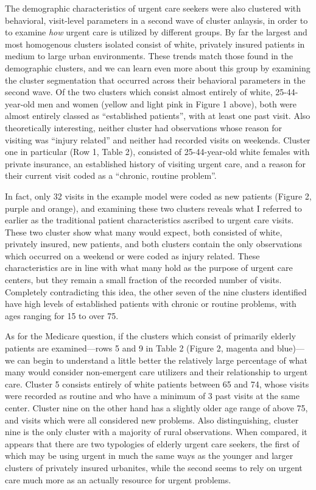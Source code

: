 \documentclass[12pt,twoside]{reedthesis}
\begin{document}
  The demographic characteristics of urgent care seekers were also
  clustered with behavioral, visit-level parameters in a second wave of
  cluster anlaysis, in order to to examine \emph{how} urgent care is
  utilized by different groups. By far the largest and most homogenous
  clusters isolated consist of white, privately insured patients in medium
  to large urban environments. These trends match those found in the
  demographic clusters, and we can learn even more about this group by
  examining the cluster segmentation that occurred across their behavioral
  parameters in the second wave. Of the two clusters which consist almost
  entirely of white, 25-44-year-old men and women (yellow and light pink
  in Figure 1 above), both were almost entirely classed as ``established
  patients'', with at least one past visit. Also theoretically
  interesting, neither cluster had observations whose reason for visiting
  was ``injury related'' and neither had recorded visits on weekends.
  Cluster one in particular (Row 1, Table 2), consisted of 25-44-year-old
  white females with private insurance, an established history of visiting
  urgent care, and a reason for their current visit coded as a ``chronic,
  routine problem''.
  
  In fact, only 32 visits in the example model were coded as new patients
  (Figure 2, purple and orange), and examining these two clusters reveals
  what I referred to earlier as the traditional patient characteristics
  ascribed to urgent care visits. These two cluster show what many would
  expect, both consisted of white, privately insured, new patients, and
  both clusters contain the only observations which occurred on a weekend
  or were coded as injury related. These characteristics are in line with
  what many hold as the purpose of urgent care centers, but they remain a
  small fraction of the recorded number of visits. Completely
  contradicting this idea, the other seven of the nine clusters identified
  have high levels of established patients with chronic or routine
  problems, with ages ranging for 15 to over 75.
  
  As for the Medicare question, if the clusters which consist of primarily
  elderly patients are examined---rows 5 and 9 in Table 2 (Figure 2,
  magenta and blue)---we can begin to understand a little better the
  relatively large percentage of what many would consider non-emergent
  care utilizers and their relationship to urgent care. Cluster 5 consists
  entirely of white patients between 65 and 74, whose visits were recorded
  as routine and who have a minimum of 3 past visits at the same center.
  Cluster nine on the other hand has a slightly older age range of above
  75, and visits which were all considered new problems. Also
  distinguishing, cluster nine is the only cluster with a majority of
  rural observations. When compared, it appears that there are two
  typologies of elderly urgent care seekers, the first of which may be
  using urgent in much the same ways as the younger and larger clusters of
  privately insured urbanites, while the second seems to rely on urgent
  care much more as an actually resource for urgent problems.
  
\end{document}
